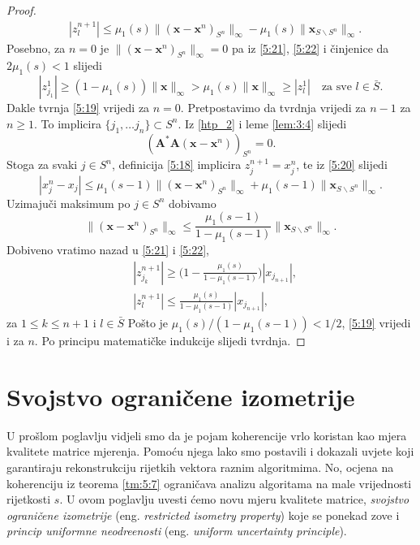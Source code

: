 \documentclass[a4paper,twoside,12pt]{memoir} %
\newcommand{\vect}[1]{\mathbf{#1}}
\renewcommand{\vec}{\vect}
\newcommand{\norm}[1]{\|{#1}\|}
\begin{document}
\begin{proof}
\begin{align}
        &|z_l^{n+1}| \leq \mu_1(s) \norm{(\vec x - \vec x^n)_{S^n}}_{\infty} - \mu_1(s)\norm{\vec x_{S \backslash S^n}}_{\infty}. \label{5:22}
    \end{align}
    Posebno, za $n = 0$ je $\norm{(\vec x - \vec x^n)_{S^n}}_{\infty} = 0$ pa iz \eqref{5:21}, \eqref{5:22} i \v{c}injenice da $2\mu_1(s) < 1$ slijedi
    \begin{equation*}
        |z_{j_1}^1| \geq (1-\mu_1(s))\norm{\vec x}_{\infty} > \mu_1(s) \norm{\vec x}_{\infty} \geq |z_l^1| \quad \text{za sve } l \in \bar S.
    \end{equation*}
    Dakle tvrnja \eqref{5:19} vrijedi za $n = 0$. Pretpostavimo da tvrdnja vrijedi za $n-1$ za $n \geq 1$. To implicira $\{j_1, \dots j_n\} \subset S^n$. Iz \eqref{htp_2} i leme \ref{lem:3:4} slijedi
    \begin{equation*}
        (\vec A^* \vec A (\vec x - \vec x^n))_{S^n} = 0.
    \end{equation*}
    Stoga za svaki $j \in S^n$, definicija \eqref{5:18} implicira $z_j^{n+1} = x_j^n$, te iz \eqref{5:20} slijedi
    \begin{equation*}
        |x_j^n - x_j| \leq \mu_1(s-1) \norm{(\vec x - \vec x^n)_{S^n}}_{\infty} + \mu_1(s-1)\norm{\vec x_{S \backslash S^n}}_{\infty}.
    \end{equation*}
    Uzimaju\v{c}i maksimum po $j \in S^n$ dobivamo
    \begin{equation*}
        \norm{(\vec x - \vec x^n)_{S^n}}_{\infty}  \leq \frac{\mu_1(s-1)}{1 - \mu_1(s-1)} \norm{\vec x_{S \backslash S^n}}_{\infty}.
    \end{equation*}
    Dobiveno vratimo nazad u \eqref{5:21} i \eqref{5:22},
    \begin{align*}
        &|z_{j_k}^{n+1}|  \geq \big( 1 - \frac{\mu_1(s)}{1 - \mu_1(s-1)}\big) |x_{j_{n+1}}|,  \\
        &|z_{l}^{n+1}|  \leq \frac{\mu_1(s)}{1 - \mu_1(s-1)}|x_{j_{n+1}}|,
    \end{align*}
    za $1 \leq k \leq n+1$ i $l \in \bar S$
    Po\v{s}to je $\mu_1(s)/(1-\mu_1(s-1)) < 1/2$, \eqref{5:19} vrijedi i za $n$. Po principu matemati\v{c}ke indukcije slijedi tvrdnja.
\end{proof}

\chapter[Svojstvo ograni\v{c}ene izometrije][Svojstvo ograni\v{c}ene izometrije]{Svojstvo ograni\v{c}ene izometrije}
U pro\v{s}lom poglavlju vidjeli smo da je pojam koherencije vrlo koristan kao mjera kvalitete matrice mjerenja. Pomo\'cu njega lako smo postavili i dokazali uvjete koji garantiraju rekonstrukciju rijetkih vektora raznim algoritmima. No, ocjena na koherenciju iz teorema \eqref{tm:5:7} ograni\v{c}ava analizu algoritama na male vrijednosti rijetkosti $s$. U ovom poglavlju uvesti \'{c}emo novu mjeru kvalitete matrice, \textit{svojstvo ograni\v{c}ene izometrije} (eng. \textit{restricted isometry property}) koje se ponekad zove i \textit{princip uniformne neodre\dj enosti} (eng. \textit{uniform uncertainty principle}).
\end{document}

